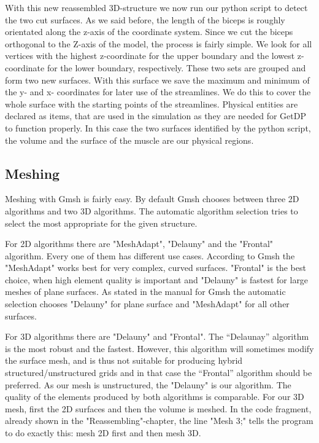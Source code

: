 \documentclass[preprint,journal]{vgtc}       %
\begin{document}
With this new reassembled 3D-structure we now run our python script to detect the two cut surfaces.
As we said before, the length of the biceps is roughly orientated along the z-axis of the coordinate system. 
Since we cut the biceps orthogonal to the Z-axis of the model, the process is fairly simple.
We look for all vertices with the highest z-coordinate for the upper boundary and the lowest z-coordinate for the lower boundary, respectively.
These two sets are grouped and form two new surfaces. 
With this surface we save the maximum and minimum of the y- and x- coordinates for later use of the streamlines. 
We do this to cover the whole surface with the starting points of the streamlines.
Physical entities are declared as items, that are used in the simulation as they are needed for GetDP to function properly.
In this case the two surfaces identified by the python script, the volume and the surface of the muscle are our physical regions. 

\subsection{Meshing}
Meshing with Gmsh is fairly easy. 
By default Gmsh chooses between three 2D algorithms and two 3D algorithms.
The automatic algorithm selection tries to select the most appropriate for the given structure.

For 2D algorithms there are "MeshAdapt", "Delauny" and the "Frontal" algorithm.
Every one of them has different use cases. 
According to Gmsh the "MeshAdapt" works best for very complex, curved surfaces.
"Frontal" is the best choice, when high element quality is important and "Delauny" is fastest for large meshes of plane surfaces.
As stated in the manual for Gmsh the automatic selection chooses "Delauny" for plane surface and "MeshAdapt" for all other surfaces. 

For 3D algorithms there are "Delauny" and "Frontal". 
The “Delaunay” algorithm is the most robust and the fastest. 
However, this algorithm will sometimes modify the surface mesh, and is thus not suitable for producing hybrid structured/unstructured grids and in that case the “Frontal” algorithm should be preferred. 
As our mesh is unstructured, the "Delauny" is our algorithm. 
The quality of the elements produced by both algorithms is comparable.
For our 3D mesh, first the 2D surfaces and then the volume is meshed. 
In the code fragment, already shown in the "Reassembling"-chapter, the line "Mesh 3;" tells the program to do exactly this: mesh 2D first and then mesh 3D.
%	
\end{document}
